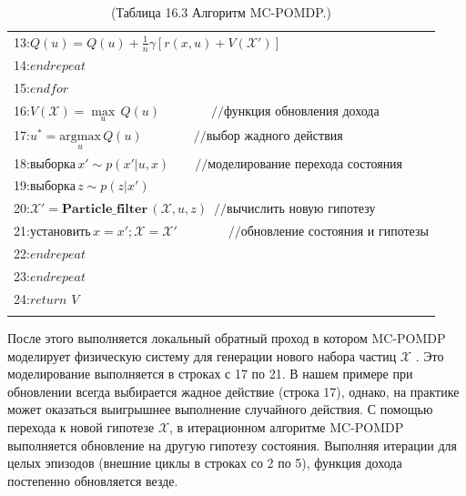 \documentclass[10pt,a4paper]{article}
\begin{document}
\begin{table}[H]
\begin{center}
\begin{tabular}{|l|}
13:\hspace{24mm}$Q(u)=Q(u)+\frac{1}{n}\gamma[r(x,u)+V(\mathcal{X}')]$\\
14:\hspace{20mm}$\textit{endrepeat}$\\
15:\hspace{15mm}$\textit{endfor}$\\
16:\hspace{15mm}$V(\mathcal{X})=\underset{u}{\max}\,Q(u)\qquad\qquad//\text{функция обновления дохода}$\\
17:\hspace{15mm}$u^*=\underset{u}{\text{argmax}}\,Q(u)\qquad\qquad//\text{выбор жадного действия}$\\
18:\hspace{15mm}$\textit{выборка}\,x'\sim p(x'|u,x)\qquad//\text{моделирование перехода состояния}$\\
19:\hspace{15mm}$\textit{выборка}\,z\sim p(z|x')$\\
20:\hspace{15mm}$\mathcal{X}'=\textbf{Particle\_filter}\,(\mathcal{X},u,z)\,\,\,//\text{вычислить новую гипотезу}$\\
21:\hspace{15mm}$\textit{установить}\,x=x';\mathcal{X}=\mathcal{X}'\qquad\qquad//\text{обновление состояния и гипотезы}$\\
22:\hspace{10mm}$\textit{endrepeat}$\\
23:\hspace{5mm}$\textit{endrepeat}$\\
24:\hspace{5mm}$\textit{return}\,\,V$\\
{}\\
\hline
\end{tabular}
\caption{(Таблица 16.3    Алгоритм MC-POMDP.)}
\end{center}
\end{table}

После этого выполняется локальный обратный проход в котором MC-POMDP моделирует физическую систему для генерации нового набора частиц $\mathcal{X}$ . Это моделирование выполняется в строках с 17 по 21. В нашем примере при обновлении всегда выбирается жадное действие (строка 17), однако, на практике может оказаться выигрышнее выполнение случайного действия. С помощью перехода к новой гипотезе $\mathcal{X}$, в итерационном алгоритме MC-POMDP выполняется обновление на другую гипотезу состояния. Выполняя итерации для целых эпизодов (внешние циклы в строках со 2 по 5), функция дохода постепенно обновляется везде.
\end{document}
